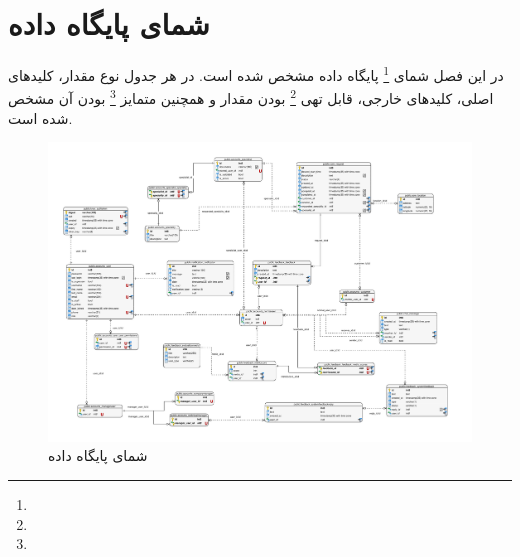 \chapter{
شمای پایگاه داده
}

در این فصل شمای
\footnote{}
 پایگاه داده مشخص شده است. در هر جدول نوع مقدار، کلیدهای اصلی، کلیدهای خارجی، قابل تهی
\footnote{}
 بودن مقدار و همچنین متمایز
 \footnote{}
  بودن آن مشخص شده است.
\begin{figure}[h]
	\centering
	\includegraphics[width=\textwidth]{figs/entity-relationship}
	\caption{شمای پایگاه داده}
	\label{database-schema}
\end{figure}

